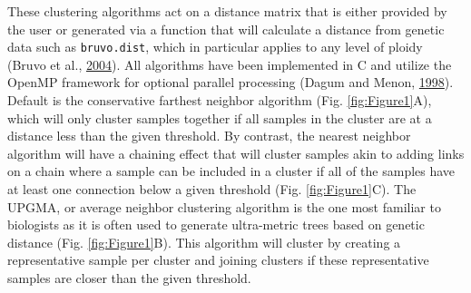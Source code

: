 \documentclass[double,12pt]{beavtex}
\begin{document}
  These clustering algorithms act on a distance matrix that is either
  provided by the user or generated via a function that will calculate a
  distance from genetic data such as \texttt{bruvo.dist}, which in
  particular applies to any level of ploidy (Bruvo et al.,
  \protect\hyperlink{ref-bruvo2004simple}{2004}). All algorithms have been
  implemented in C and utilize the OpenMP framework for optional parallel
  processing (Dagum and Menon,
  \protect\hyperlink{ref-dagum1998openmp}{1998}). Default is the
  conservative farthest neighbor algorithm (Fig. \ref{fig:Figure1}A),
  which will only cluster samples together if all samples in the cluster
  are at a distance less than the given threshold. By contrast, the
  nearest neighbor algorithm will have a chaining effect that will cluster
  samples akin to adding links on a chain where a sample can be included
  in a cluster if all of the samples have at least one connection below a
  given threshold (Fig. \ref{fig:Figure1}C). The UPGMA, or average
  neighbor clustering algorithm is the one most familiar to biologists as
  it is often used to generate ultra-metric trees based on genetic
  distance (Fig. \ref{fig:Figure1}B). This algorithm will cluster by
  creating a representative sample per cluster and joining clusters if
  these representative samples are closer than the given threshold.
  
\end{document}
